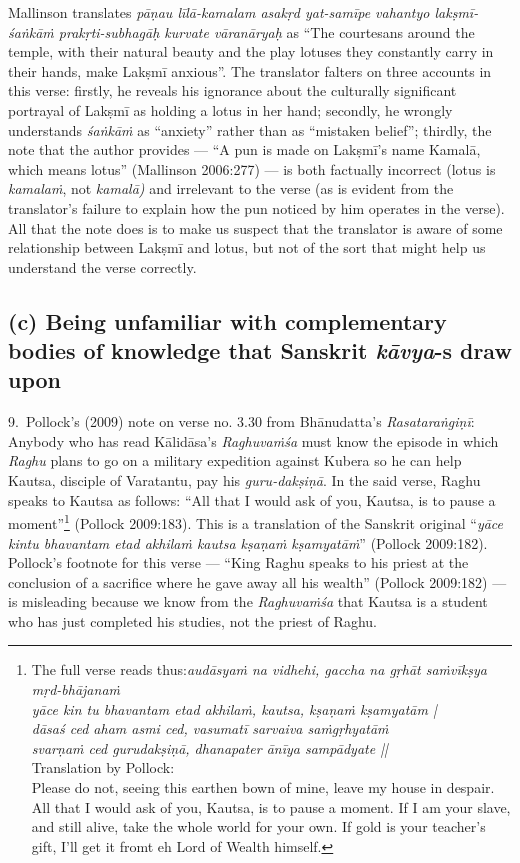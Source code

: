 Mallinson translates \textsl{pāṇau līlā-kamalam asakṛd yat-samīpe vahantyo lakṣmī-śaṅkāṁ prakṛti-subhagāḥ kurvate vāranāryaḥ} as “The courtesans around the temple, with their natural beauty and the play lotuses they constantly carry in their hands, make Lakṣmī anxious”. The translator falters on three accounts in this verse: firstly, he reveals his ignorance about the culturally significant portrayal of Lakṣmī as holding a lotus in her hand; secondly, he wrongly understands \textsl{śaṅkāṁ}  as “anxiety” rather than as “mistaken belief”; thirdly, the note that the author provides --- “A pun is made on Lakṣmī’s name Kamalā, which means lotus” (Mallinson 2006:277) --- is both factually incorrect (lotus is \textsl{kamalaṁ}, not \textsl{kamalā)}  and irrelevant to the verse (as is evident from the translator’s failure to explain how the pun noticed by him operates in the verse). All that the note does is to make us suspect that the translator is aware of some relationship between Lakṣmī and lotus, but not of the sort that might help us understand the verse correctly.

\subsection*{(c) Being unfamiliar with complementary bodies of knowledge that Sanskrit \textsl{kāvya}-s draw upon}

9.~Pollock’s (2009) note on verse no. 3.30 from Bhānudatta’s \textsl{Rasataraṅgiṇī}: Anybody who has read Kālidāsa’s \textsl{Raghuvaṁśa }must know the episode in which \textsl{Raghu} plans to go on a military expedition against Kubera so he can help Kautsa, disciple of Varatantu, pay his \textsl{guru-dakṣiṇā}. In the said verse, Raghu speaks to Kautsa as follows: “All that I would ask of you, Kautsa, is to pause a moment”\footnote[6]{The full verse reads thus:\textsl{audāsyaṁ na vidhehi, gaccha na gṛhāt saṁvīkṣya mṛd-bhājanaṁ}\\
\textsl{yāce kin tu bhavantam etad akhilaṁ, kautsa, kṣaṇaṁ kṣamyatām |}\\
\textsl{dāsaś ced aham asmi ced, vasumatī sarvaiva saṁgṛhyatāṁ}\\
\textsl{svarṇaṁ ced gurudakṣiṇā, dhanapater ānīya sampādyate ||}\\
Translation by Pollock:\\
Please do not, seeing this earthen bown of mine, leave my house in despair. All that I would ask of you, Kautsa, is to pause a moment. If I am your slave, and still alive, take the whole world for your own. If gold is your teacher’s gift, I’ll get it fromt eh Lord of Wealth himself.} (Pollock 2009:183). This is a translation of the Sanskrit original “\textsl{yāce kintu bhavantam etad akhilaṁ kautsa kṣaṇaṁ kṣamyatāṁ}” (Pollock 2009:182). Pollock’s footnote for this verse --- “King Raghu speaks to his priest at the conclusion of a sacrifice where he gave away all his wealth” (Pollock 2009:182) --- is misleading because we know from the \textsl{Raghuvaṁśa} that Kautsa is a student who has just completed his studies, not the priest of Raghu.

